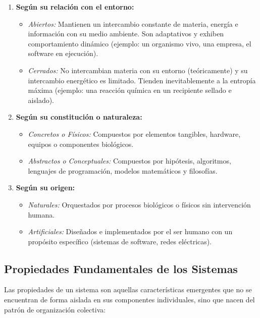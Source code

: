\documentclass[12pt,letterpaper]{article}
\begin{document}
\begin{enumerate}[leftmargin=1.27cm, label=\arabic*.]
    \item \textbf{Según su relación con el entorno:}
    \begin{itemize}[leftmargin=0.8cm, label=--]
        \item \textit{Abiertos:} Mantienen un intercambio constante de materia, energía e información con su medio ambiente. Son adaptativos y exhiben comportamiento dinámico (ejemplo: un organismo vivo, una empresa, el software en ejecución).
        \item \textit{Cerrados:} No intercambian materia con su entorno (teóricamente) y su intercambio energético es limitado. Tienden inevitablemente a la entropía máxima (ejemplo: una reacción química en un recipiente sellado e aislado).
    \end{itemize}
    
    \item \textbf{Según su constitución o naturaleza:}
    \begin{itemize}[leftmargin=0.8cm, label=--]
        \item \textit{Concretos o Físicos:} Compuestos por elementos tangibles, hardware, equipos o componentes biológicos.
        \item \textit{Abstractos o Conceptuales:} Compuestos por hipótesis, algoritmos, lenguajes de programación, modelos matemáticos y filosofías.
    \end{itemize}
    
    \item \textbf{Según su origen:}
    \begin{itemize}[leftmargin=0.8cm, label=--]
        \item \textit{Naturales:} Orquestados por procesos biológicos o físicos sin intervención humana.
        \item \textit{Artificiales:} Diseñados e implementados por el ser humano con un propósito específico (sistemas de software, redes eléctricas).
    \end{itemize}
\end{enumerate}
\newpage
\subsection*{Propiedades Fundamentales de los Sistemas}

Las propiedades de un sistema son aquellas características emergentes que no se encuentran de forma aislada en sus componentes individuales, sino que nacen del patrón de organización colectiva:
\end{document}
